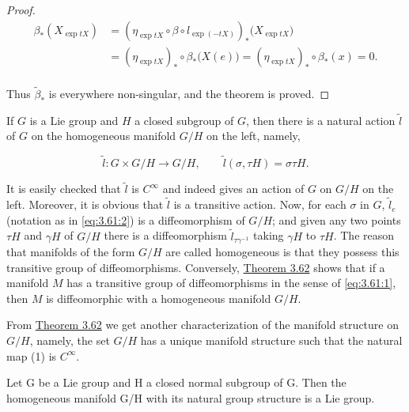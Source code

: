 \begin{proof}
\[
\begin{aligned}{\beta_{*}(X_{\exp tX})}&{{}=(\eta_{\exp tX}\circ\beta\circ l_{\exp(-tX)})_{*}\big(X_{\exp tX}\big)}\\ {}&{{}=(\eta_{\exp tX})_{*}\circ \beta_{*}\big(X(e)\big)=(\eta_{\exp tX})_{*}\circ \beta_{*}(x)=0.}\\ \end{aligned}
\]

Thus $\tilde{\beta}_{*}$ is everywhere non-singular, and the theorem is proved.

\end{proof}

\begin{remarks}\label{thm:3.63}
If $G$ is a Lie group and $H$ a closed subgroup of $G$, then there is a natural action $\tilde{l}$ of $G$ on the homogeneous manifold $G/H$ on the left, namely,

\begin{equation}
\tag{1}\label{eq:3.63:1}
\tilde{l}\colon G\times G/H\to G/H,\qquad\tilde{l}(\sigma,\tau H)=\sigma\tau H.
\end{equation}

It is easily checked that $\tilde{l}$ is $C^{\infty}$ and indeed gives an action of $G$ on $G/H$ on the left. Moreover, it is obvious that $\tilde{l}$ is a transitive action. Now, for each $\sigma$ in $G$, $\tilde{l}_{e}$ (notation as in \eqref{eq:3.61:2}) is a diffeomorphism of $G/H$; and given any two points $\tau H$ and $\gamma H$ of $G/H$ there is a diffeomorphism $\tilde{l}_{\tau\gamma^{-1}}$ taking $\gamma H$ to $\tau H$. The reason that manifolds of the form $G/H$ are called homogeneous is that they possess this transitive group of diffeomorphisms. Conversely, \hyperref[thm:3.62]{Theorem 3.62} shows that if a manifold $M$ has a transitive group of diffeomorphisms in the sense of \eqref{eq:3.61:1}, then $M$ is diffeomorphic with a homogeneous manifold $G/H$.

From \hyperref[thm:3.62]{Theorem 3.62} we get another characterization of the manifold structure on $G/H$, namely, the set $G/H$ has a unique manifold structure such that the natural map (1) is $C^{\infty}$.

\end{remarks}

\begin{theorem}\label{thm:3.64}
Let G be a Lie group and H a closed normal subgroup of G. Then the homogeneous manifold G/H with its natural group structure is a Lie group.

\end{theorem}

